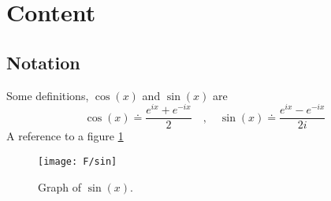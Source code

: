 \section{Content}

\subsection{Notation}

\begin{Defn}
  \label{defn:1}
  Some definitions, $\cos(x)$ and \(\sin(x)\) are
  \begin{equation}
    \label{eq:fefwe}
    \cos(x) \doteq \frac{e^{ix}+e^{-ix}}{2} \quad,\quad     \sin(x) \doteq \frac{e^{ix}-e^{-ix}}{2i}
  \end{equation}
  A reference to a figure \ref{fig:a354}
\end{Defn}



\begin{figure}[ht]\label{fig:a354}
  \begin{center}
    \texttt{[image: F/sin]}
    \caption{Graph of \(\sin(x)\).}
  \end{center}
\end{figure}


\lipsum[2]


